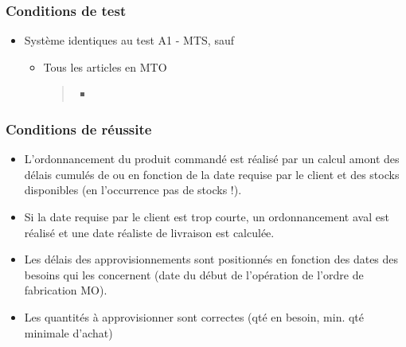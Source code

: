 \documentclass[letterpaper,10pt,french]{sphinxmanual}
\begin{document}
\subsubsection{Conditions de test}
\label{\detokenize{readthedocs/tests/A1_MTO:conditions-de-test}}\begin{itemize}
\item {} 
Système identiques au test A1 - MTS, sauf
\begin{itemize}
\item {} 
Tous les articles en MTO
\begin{quote}

\begin{figure}[htbp]
\centering

\noindent{}
\end{figure}
\begin{itemize}
\item {} 

\end{itemize}
\end{quote}

\end{itemize}

\end{itemize}


\subsubsection{Conditions de réussite}
\label{\detokenize{readthedocs/tests/A1_MTO:conditions-de-reussite}}\begin{itemize}
\item {} 
L’ordonnancement du produit commandé est réalisé par un calcul amont des délais cumulés de  ou  en fonction de la date requise par le client et des stocks disponibles (en l’occurrence pas de stocks !).

\item {} 
Si la date requise par le client est trop courte, un ordonnancement aval est réalisé et une date réaliste de livraison est calculée.

\item {} 
Les délais des approvisionnements sont positionnés en fonction des dates des besoins qui les concernent (date du début de l’opération de l’ordre de fabrication MO).

\item {} 
Les quantités à approvisionner sont correctes (qté en besoin, min. qté minimale d’achat)

\end{itemize}
\end{document}
